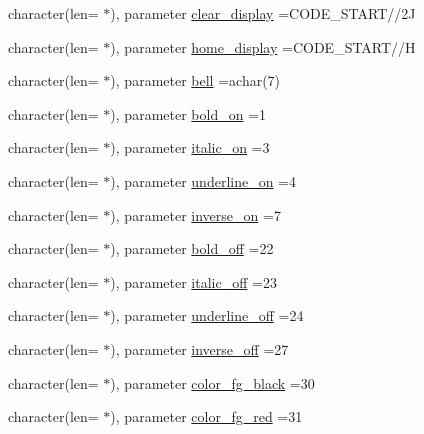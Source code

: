 \begin{DoxyCompactItemize}
\item 
character(len= $\ast$), parameter \mbox{\hyperlink{namespacem__escape_a9d45e30ea5891b89dc9a61ba1b5dbc03}{clear\+\_\+display}} =C\+O\+D\+E\+\_\+\+S\+T\+A\+RT//\textquotesingle{}2\+J\textquotesingle{}
\item 
character(len= $\ast$), parameter \mbox{\hyperlink{namespacem__escape_ae4634ac062742627f215df29998fc677}{home\+\_\+display}} =C\+O\+D\+E\+\_\+\+S\+T\+A\+RT//\textquotesingle{}H\textquotesingle{}
\item 
character(len= $\ast$), parameter \mbox{\hyperlink{namespacem__escape_a2cd9c30d3783af9d1f74a50e7f1dbd7f}{bell}} =achar(7)
\item 
character(len= $\ast$), parameter \mbox{\hyperlink{namespacem__escape_a8f30470c66af08cf881d9afe23357a03}{bold\+\_\+on}} =\textquotesingle{}1\textquotesingle{}
\item 
character(len= $\ast$), parameter \mbox{\hyperlink{namespacem__escape_a5bd07ea0cedbfd7d0e04b3b0be74821f}{italic\+\_\+on}} =\textquotesingle{}3\textquotesingle{}
\item 
character(len= $\ast$), parameter \mbox{\hyperlink{namespacem__escape_a6f4bcc5f8acb0683ed6d8e05c0100daa}{underline\+\_\+on}} =\textquotesingle{}4\textquotesingle{}
\item 
character(len= $\ast$), parameter \mbox{\hyperlink{namespacem__escape_afacdc9d33171b768ee026b1eb6726f8a}{inverse\+\_\+on}} =\textquotesingle{}7\textquotesingle{}
\item 
character(len= $\ast$), parameter \mbox{\hyperlink{namespacem__escape_a978fe9a5d07621c57c3163d8a7a62118}{bold\+\_\+off}} =\textquotesingle{}22\textquotesingle{}
\item 
character(len= $\ast$), parameter \mbox{\hyperlink{namespacem__escape_a93fc5a4e6f0ed044c9f6cf29412a05cb}{italic\+\_\+off}} =\textquotesingle{}23\textquotesingle{}
\item 
character(len= $\ast$), parameter \mbox{\hyperlink{namespacem__escape_a9e36a1a9bd4a64702ecef4a2e3d592b9}{underline\+\_\+off}} =\textquotesingle{}24\textquotesingle{}
\item 
character(len= $\ast$), parameter \mbox{\hyperlink{namespacem__escape_affae80c7d63858227a9f3134e6191f96}{inverse\+\_\+off}} =\textquotesingle{}27\textquotesingle{}
\item 
character(len= $\ast$), parameter \mbox{\hyperlink{namespacem__escape_a6c7b72b2cfc0a6ec7fc4080ad6750d99}{color\+\_\+fg\+\_\+black}} =\textquotesingle{}30\textquotesingle{}
\item 
character(len= $\ast$), parameter \mbox{\hyperlink{namespacem__escape_a35eecf0fb916821d94b9c47b2045fe44}{color\+\_\+fg\+\_\+red}} =\textquotesingle{}31\textquotesingle{}

\end{DoxyCompactItemize}
